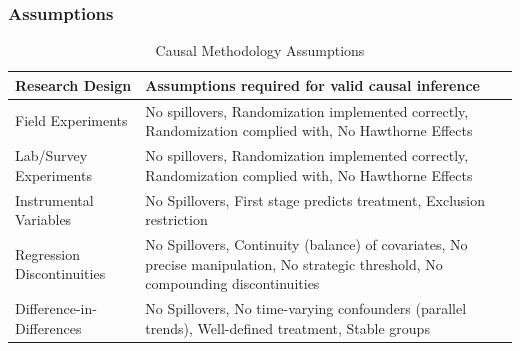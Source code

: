 \documentclass[xcolor=x11names,compress]{beamer}\usepackage[]{graphicx}\usepackage[]{color}
\renewcommand{\(}{\begin{columns}}
\renewcommand{\)}{\end{columns}}
\newcommand{\<}[1]{\begin{column}{#1}}
\renewcommand{\>}{\end{column}}
\begin{document}
\begin{frame}
\frametitle{Assumptions}
\footnotesize
\begin{table}[htbp]
  \centering
  \caption{Causal Methodology Assumptions}
    \begin{tabular}{|p{3cm}|p{6cm}|}
    \hline
    \textbf{Research Design} & \textbf{Assumptions required for valid causal inference} \bigstrut\\
    \hline
    Field Experiments & No spillovers, Randomization implemented correctly, Randomization complied with, No Hawthorne Effects \bigstrut\\
    \hline
    Lab/Survey Experiments & No spillovers, Randomization implemented correctly, Randomization complied with, No Hawthorne Effects \bigstrut\\
    \hline
    Instrumental Variables & No Spillovers, First stage predicts treatment, Exclusion restriction \bigstrut\\
    \hline
    Regression Discontinuities & No Spillovers, Continuity (balance) of covariates, No precise manipulation, No strategic threshold, No compounding discontinuities \bigstrut\\
    \hline
    Difference-in-Differences & No Spillovers, No time-varying confounders (parallel trends), Well-defined treatment, Stable groups \bigstrut\\
    \hline
    \end{tabular}%
  \label{tab:addlabel}%
\end{table}%
\normalsize
\end{frame}
\end{document}

